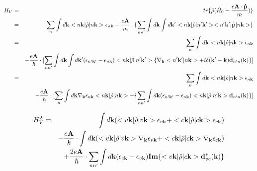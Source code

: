 \documentclass[aps,prb,preprint]{revtex4-1}
\begin{document}
\begin{appendix}
 \begin{eqnarray}
H_V &=& tr\{\hat{\rho}( \hat{H}_0 - \frac{e{\bf A \cdot \hat{p}}}{m}) \} \nonumber \\
&=& \sum_n \int d{\bf k} <n{\bf k}| \hat{\rho} |n{\bf k}> \epsilon_{n{\bf k}} - \frac{e{\bf A}}{m} \cdot \{ \sum_{nn'} \int d{\bf k} \int d{\bf k'} <n{\bf k}| \hat{\rho} |n'{\bf k'}><n'{\bf k'}| \hat{\bf p} |n{\bf k}> \} \nonumber \\
&=& \sum_n \int d{\bf k} <n{\bf k}| \hat{\rho} |n{\bf k}> \epsilon_{n{\bf k}}\\
&& - \frac{e{\bf A}}{\hbar} \cdot [ \sum_{nn'} \int d{\bf k} \int d{\bf k'}  (\epsilon_{n'{\bf k'}}-\epsilon_{n{\bf k}}) <n{\bf k}| \hat{\rho} |n'{\bf k'}>\{\nabla_{\bf k} <n'{\bf k'}|n{\bf k}> + i \delta({\bf k'-k}) {\bf d}_{n'n}({\bf k}) \} ] \nonumber \\
&=& \sum_n \int d{\bf k} <n{\bf k}| \hat{\rho} |n{\bf k}> \epsilon_{n{\bf k}}\\
&& - \frac{e{\bf A}}{\hbar} \cdot [ \sum_{n} \int d{\bf k} \nabla_{\bf k} \epsilon_{n{\bf k}} <n{\bf k}| \hat{\rho} |n{\bf k}> + i \sum_{nn'} \int d{\bf k} (\epsilon_{n'{\bf k'}}-\epsilon_{n{\bf k}}) <n{\bf k}| \hat{\rho} |n'{\bf k}> {\bf d}_{n'n}({\bf k}) \} ] \nonumber \\
\end{eqnarray}

 \begin{eqnarray}
H_V^2 &=& \int d{\bf k} (<v{\bf k}| \hat{\rho} |v{\bf k}> \epsilon_{v{\bf k}}+ <c{\bf k}| \hat{\rho} |c{\bf k}> \epsilon_{c{\bf k}}) \nonumber \\
&& - \frac{e{\bf A}}{\hbar} \cdot \int d{\bf k} ( <v{\bf k}| \hat{\rho} |v{\bf k}> \nabla_{\bf k} \epsilon_{v{\bf k}} + <c{\bf k}| \hat{\rho} |c{\bf k}> \nabla_{\bf k} \epsilon_{c{\bf k}} ) \nonumber \\
&& + \frac{2e{\bf A}}{\hbar} \cdot  \sum_{nn'} \int d{\bf k} (\epsilon_{c{\bf k}}-\epsilon_{v{\bf k}}) {\bf Im}\{<v{\bf k}| \hat{\rho} |c{\bf k}> {\bf d}_{vc}^*({\bf k}) \} \nonumber \\
\end{eqnarray}


\end{appendix}
\end{document}
